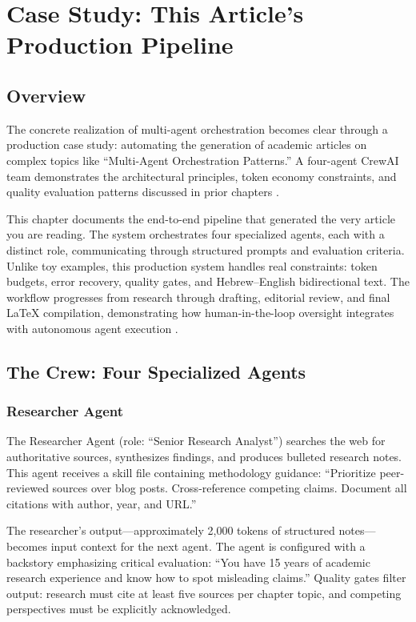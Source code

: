 \chapter{Case Study: This Article's Production Pipeline}\label{ch:casestudy}

\section{Overview}\label{sec:overview}

The concrete realization of multi-agent orchestration becomes clear through a production case study: automating the generation of academic articles on complex topics like ``Multi-Agent Orchestration Patterns.'' A four-agent CrewAI team demonstrates the architectural principles, token economy constraints, and quality evaluation patterns discussed in prior chapters \cite{Segal2026}.

This chapter documents the end-to-end pipeline that generated the very article you are reading. The system orchestrates four specialized agents, each with a distinct role, communicating through structured prompts and evaluation criteria. Unlike toy examples, this production system handles real constraints: token budgets, error recovery, quality gates, and Hebrew--English bidirectional text. The workflow progresses from research through drafting, editorial review, and final LaTeX compilation, demonstrating how human-in-the-loop oversight integrates with autonomous agent execution \cite{LangChain2024a}.

\section{The Crew: Four Specialized Agents}\label{sec:crew}

\subsection{Researcher Agent}

The Researcher Agent (role: ``Senior Research Analyst'') searches the web for authoritative sources, synthesizes findings, and produces bulleted research notes. This agent receives a skill file containing methodology guidance: ``Prioritize peer-reviewed sources over blog posts. Cross-reference competing claims. Document all citations with author, year, and URL.''

The researcher's output—approximately 2,000 tokens of structured notes—becomes input context for the next agent. The agent is configured with a backstory emphasizing critical evaluation: ``You have 15 years of academic research experience and know how to spot misleading claims.'' Quality gates filter output: research must cite at least five sources per chapter topic, and competing perspectives must be explicitly acknowledged.

